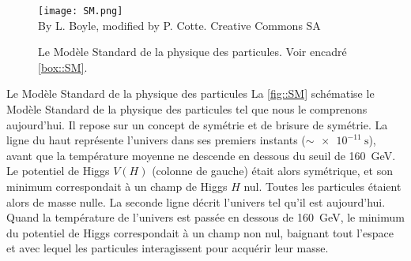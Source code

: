       \begin{figure}[!htb!]
        \centering
        \texttt{[image: SM.png]}\\
        \tiny{By L. Boyle, modified by P. Cotte. Creative Commons SA}
        \caption[Le Modèle Standard de la physique des particules]{\label{fig::SM}Le Modèle Standard de la physique des particules. Voir encadré \ref{box::SM}.}
      \end{figure}
      \begin{figure*}[!htb!]
        \begin{activitybox}[label=box::SM]{Le Modèle Standard de la physique des particules}
          La \autoref{fig::SM} schématise le Modèle Standard de la physique des particules tel que nous le comprenons aujourd’hui. Il repose sur un concept de symétrie et de brisure de symétrie. La ligne du haut représente l'univers dans ses premiers instants ($\sim\SI{e-11}{\second}$), avant que la température moyenne ne descende en dessous du seuil de \SI{160}{\giga\electronvolt}. Le potentiel de Higgs $V(H)$ (colonne de gauche) était alors symétrique, et son minimum correspondait à un champ de Higgs $H$ nul. Toutes les particules étaient alors de masse nulle. La seconde ligne décrit l'univers tel qu'il est aujourd'hui. Quand la température de l'univers est passée en dessous de \SI{160}{\giga\electronvolt}, le minimum du potentiel de Higgs correspondait à un champ non nul, baignant tout l'espace et avec lequel les particules interagissent pour acquérir leur masse.
        

\end{activitybox}
\end{figure*}
